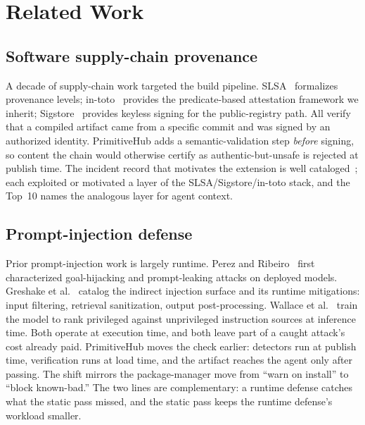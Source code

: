 
\section{Related Work}
\label{sec:related}

\subsection{Software supply-chain provenance}

A decade of supply-chain work targeted the build pipeline.
SLSA~\cite{SLSA:2023:provenance-spec} formalizes provenance levels;
in-toto~\cite{in-toto:2016:supply-chain} provides the predicate-based
attestation framework we inherit; Sigstore~\cite{Sigstore:2021:keyless-signing}
provides keyless signing for the public-registry path. All verify that a
compiled artifact came from a specific commit and was signed by an
authorized identity. PrimitiveHub adds a semantic-validation step
\emph{before} signing, so content the chain would otherwise certify as
authentic-but-unsafe is rejected at publish time. The incident record
that motivates the extension is well
cataloged~\cite{SolarWinds:2020:supply-chain,Codecov:2021:bash-uploader,ua-parser-js:2021:npm-typosquat,eslint-config-prettier:2024:maintainer-compromise,xz-utils:2024:CVE-2024-3094,Shai-Hulud:2025:npm-worm};
each exploited or motivated a layer of the SLSA/Sigstore/in-toto stack,
and the Top~10 names the analogous layer for agent context.

\subsection{Prompt-injection defense}

Prior prompt-injection work is largely runtime. Perez and
Ribeiro~\cite{Perez:2022:ignore-previous-prompt} first characterized
goal-hijacking and prompt-leaking attacks on deployed models. Greshake et
al.~\cite{Greshake:2023:prompt-injection-survey} catalog the indirect
injection surface and its runtime mitigations: input filtering,
retrieval sanitization, output post-processing. Wallace et
al.~\cite{Wallace:2024:instruction-hierarchy} train the model to rank
privileged against unprivileged instruction sources at inference time.
Both operate at execution time, and both leave part of a caught attack's
cost already paid. PrimitiveHub moves the check earlier: detectors run at
publish time, verification runs at load time, and the artifact reaches
the agent only after passing. The shift mirrors the package-manager move
from ``warn on install'' to ``block known-bad.'' The two lines are
complementary: a runtime defense catches what the static pass missed,
and the static pass keeps the runtime defense's workload smaller.

